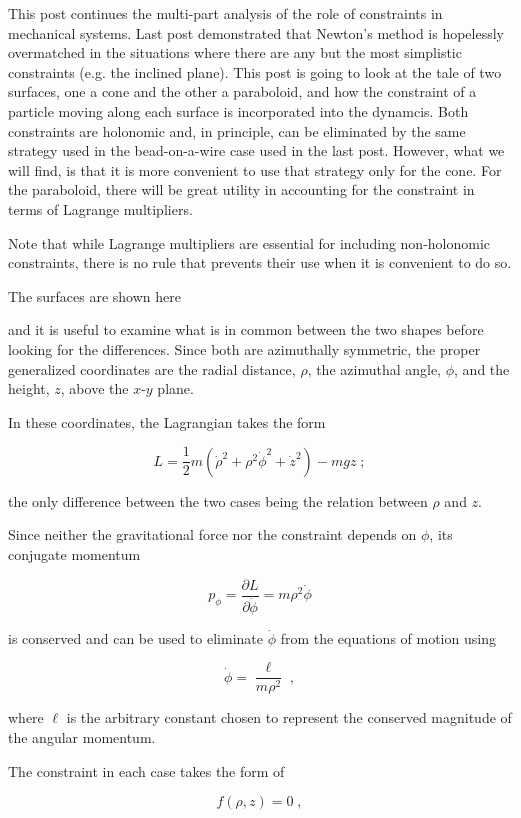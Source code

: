 \documentclass[12pt]{article}
\begin{document}
This post continues the multi-part analysis of the role of constraints in mechanical systems.  Last post demonstrated that Newton's method is hopelessly overmatched in the situations where there are any but the most simplistic constraints (e.g. the inclined plane).  This post is going to look at the tale of two surfaces, one a cone and the other a paraboloid, and how the constraint of a particle moving along each surface is incorporated into the dynamcis.  Both constraints are holonomic and, in principle, can be eliminated by the same strategy used in the bead-on-a-wire case used in the last post.  However, what we will find, is that it is more convenient to use that strategy only for the cone.  For the paraboloid, there will be great utility in accounting for the constraint in terms of Lagrange multipliers.

Note that while Lagrange multipliers are essential for including non-holonomic constraints, there is no rule that prevents their use when it is convenient to do so.  

The surfaces are shown here

and it is useful to examine what is in common between the two shapes before looking for the differences.  Since both are azimuthally symmetric, the proper generalized coordinates are the radial distance, $\rho$, the azimuthal angle, $\phi$, and the height, $z$, above the $x$-$y$ plane.

In these coordinates, the Lagrangian takes the form

\[ L = \frac{1}{2} m \left( \dot \rho^2 + \rho^2 \dot \phi^2 + \dot z^2 \right) - m g z \; ; \]

the only difference between the two cases being the relation between $\rho$ and $z$.

Since neither the gravitational force nor the constraint depends on $\phi$, its conjugate momentum 

\[ p_{\phi} = \frac{\partial L}{\partial \dot \phi} = m \rho^2 \dot \phi \]

is conserved and can be used to eliminate $\dot \phi$ from the equations of motion using 

\[ \dot \phi = \frac{\ell}{m \rho^2} \; , \]

where $\ell$ is the arbitrary constant chosen to represent the conserved magnitude of the angular momentum.

The constraint in each case takes the form of 

\[ f(\rho,z) = 0 \; , \]
\end{document}
